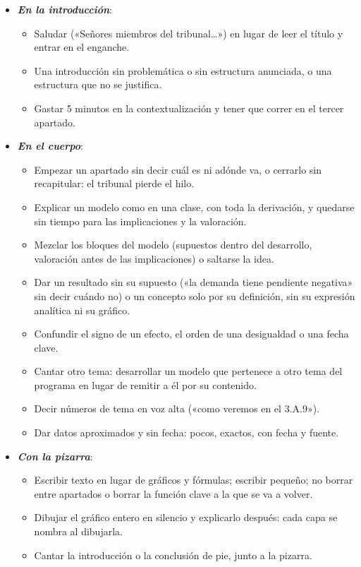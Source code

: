 \documentclass[11pt]{article}
\begin{document}
\begin{itemize}
\item \textbf{\emph{En la introducción}}:
  \begin{itemize}
  \item Saludar («Señores miembros del tribunal…») en lugar de leer el título y entrar en el enganche.
  \item Una introducción sin problemática o sin estructura anunciada, o una estructura que no se justifica.
  \item Gastar 5 minutos en la contextualización y tener que correr en el tercer apartado.
  \end{itemize}
\item \textbf{\emph{En el cuerpo}}:
  \begin{itemize}
  \item Empezar un apartado sin decir cuál es ni adónde va, o cerrarlo sin recapitular: el tribunal pierde el hilo.
  \item Explicar un modelo como en una clase, con toda la derivación, y quedarse sin tiempo para las implicaciones y la valoración.
  \item Mezclar los bloques del modelo (supuestos dentro del desarrollo, valoración antes de las implicaciones) o saltarse la idea.
  \item Dar un resultado sin su supuesto («la demanda tiene pendiente negativa» sin decir cuándo no) o un concepto solo por su definición, sin su expresión analítica ni su gráfico.
  \item Confundir el signo de un efecto, el orden de una desigualdad o una fecha clave.
  \item Cantar otro tema: desarrollar un modelo que pertenece a otro tema del programa en lugar de remitir a él por su contenido.
  \item Decir números de tema en voz alta («como veremos en el 3.A.9»).
  \item Dar datos aproximados y sin fecha: pocos, exactos, con fecha y fuente.
  \end{itemize}
\item \textbf{\emph{Con la pizarra}}:
  \begin{itemize}
  \item Escribir texto en lugar de gráficos y fórmulas; escribir pequeño; no borrar entre apartados o borrar la función clave a la que se va a volver.
  \item Dibujar el gráfico entero en silencio y explicarlo después: cada capa se nombra al dibujarla.
  \item Cantar la introducción o la conclusión de pie, junto a la pizarra.

\end{itemize}
\end{itemize}
\end{document}
